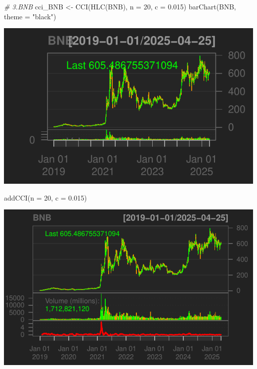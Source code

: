 \documentclass[]{tufte-handout}
\newenvironment{Shaded}{}{}
\newcommand{\AttributeTok}[1]{\textcolor[rgb]{0.49,0.56,0.16}{#1}}
\newcommand{\CommentTok}[1]{\textcolor[rgb]{0.38,0.63,0.69}{\textit{#1}}}
\newcommand{\DecValTok}[1]{\textcolor[rgb]{0.25,0.63,0.44}{#1}}
\newcommand{\FloatTok}[1]{\textcolor[rgb]{0.25,0.63,0.44}{#1}}
\newcommand{\FunctionTok}[1]{\textcolor[rgb]{0.02,0.16,0.49}{#1}}
\newcommand{\NormalTok}[1]{#1}
\newcommand{\OtherTok}[1]{\textcolor[rgb]{0.00,0.44,0.13}{#1}}
\newcommand{\StringTok}[1]{\textcolor[rgb]{0.25,0.44,0.63}{#1}}
\begin{document}
\begin{Shaded}
\begin{Highlighting}[]
\CommentTok{\# 3.BNB}
\NormalTok{cci\_BNB }\OtherTok{\textless{}{-}} \FunctionTok{CCI}\NormalTok{(}\FunctionTok{HLC}\NormalTok{(BNB), }\AttributeTok{n =} \DecValTok{20}\NormalTok{, }\AttributeTok{c =} \FloatTok{0.015}\NormalTok{)}
\FunctionTok{barChart}\NormalTok{(BNB, }\AttributeTok{theme =} \StringTok{"black"}\NormalTok{)}
\end{Highlighting}
\end{Shaded}

\includegraphics{cripto_update_files/figure-latex/unnamed-chunk-12-5}

\begin{Shaded}
\begin{Highlighting}[]
\FunctionTok{addCCI}\NormalTok{(}\AttributeTok{n =} \DecValTok{20}\NormalTok{, }\AttributeTok{c =} \FloatTok{0.015}\NormalTok{)}
\end{Highlighting}
\end{Shaded}

\includegraphics{cripto_update_files/figure-latex/unnamed-chunk-12-6}
\end{document}
